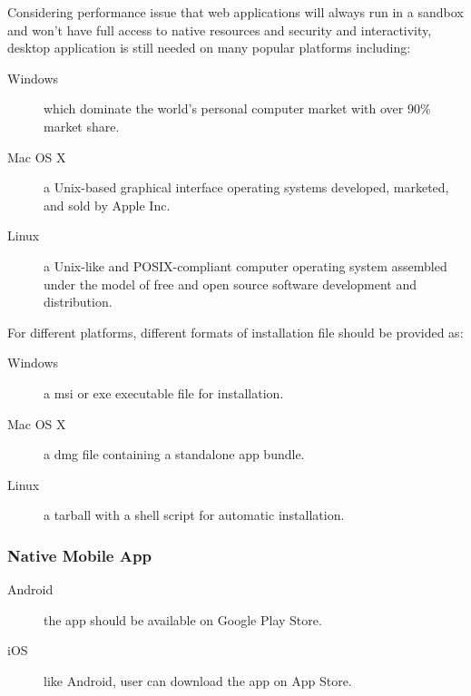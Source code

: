 Considering performance issue that web applications will always run in a sandbox 
and won't have full access to native resources and security and interactivity, desktop application
is still needed on many popular platforms including:

\begin{description}
\item[Windows] which dominate the world's personal computer market with over 90\% market share.
\item[Mac OS X] a Unix-based graphical interface operating systems developed, marketed, and sold by Apple Inc.
\item[Linux] a Unix-like and POSIX-compliant computer operating system assembled under the model of free and open source software development and distribution.
\end{description}

For different platforms, different formats of installation file should be provided as:

\begin{description}
\item[Windows] a msi or exe executable file for installation.
\item[Mac OS X] a dmg file containing a standalone app bundle.
\item[Linux] a tarball with a shell script for automatic installation.
\end{description}

\subsubsection{Native Mobile App}

\begin{description}
\item[Android] the app should be available on Google Play Store.
\item[iOS] like Android, user can download the app on App Store.
\end{description}

